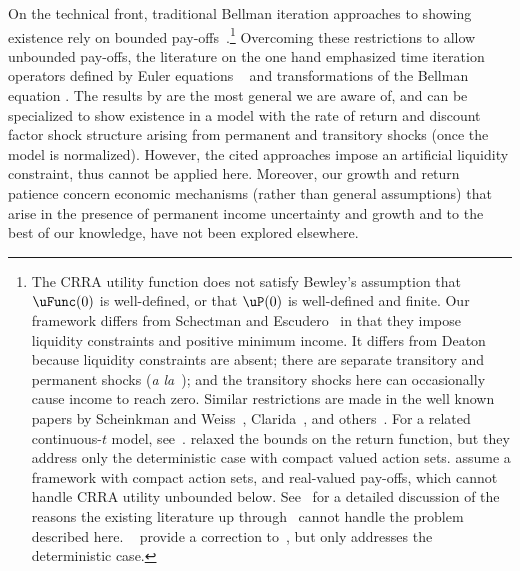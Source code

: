\documentclass[BufferStockTheory]{subfiles}
\begin{document}
On the technical front, traditional Bellman iteration approaches to showing existence rely on bounded pay-offs~\citep{slpMethods}.\footnote{The CRRA utility function does not satisfy Bewley's assumption that $\uFunc(0)$ is well-defined, or that $\uP(0)$ is well-defined and finite.  Our framework differs from Schectman and Escudero~\citeyearpar{seIncFluct} in that they impose liquidity constraints and positive minimum income. It differs from Deaton~\citeyearpar{deatonLiqConstr} because liquidity constraints are absent; there are separate transitory and permanent shocks (\textit{a la}~\cite{muthOptimal}); and the transitory shocks here can occasionally cause income to reach zero. Similar restrictions are made in the well known papers by Scheinkman and Weiss~\citeyearpar{scheinkman&weiss:borrowing}, Clarida~\citep{claridaErgodic}, and others~\cite{cwcUnderUncert}. For a related continuous-$t$ model, see~\cite{tocheUrisk}. \cite{asHomogeneous} relaxed the bounds on the return function, but they address only the deterministic case with compact valued action sets. \cite{mnUnique} assume a framework with compact action sets, and real-valued pay-offs, which cannot handle CRRA utility unbounded below. See~\cite{yaoNote} for a detailed discussion of the reasons the existing literature up through~\cite{mnUnique} cannot handle the problem described here. \@~\cite{mvExistence} provide a correction to~\cite{rrExistence}, but only addresses the deterministic case.} Overcoming these restrictions to allow unbounded pay-offs, the literature on the one hand emphasized time iteration operators defined by Euler equations ~\citep{deatonLiqConstr, lsIncFluct, mstIncFluct} and transformations of the Bellman equation  \citep{maUnboundedDP}. The results by \cite{mstIncFluct,maUnboundedDP} are the most general we are aware of, and can be specialized to show existence in a model with the rate of return and discount factor shock structure arising from permanent and transitory shocks (once the model is normalized). However, the cited approaches impose an artificial liquidity constraint, thus cannot be applied here. Moreover, our  growth and return patience concern economic mechanisms (rather than general assumptions) that arise in the presence of permanent income uncertainty and growth and to the best of our knowledge, have not been explored elsewhere. 

%
\end{document}
